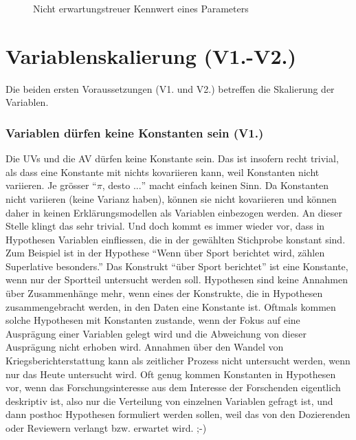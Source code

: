 \documentclass[
  10pt,
  letterpaper,
  a4paper, twoside]{scrreprt}
\begin{document}
\begin{tcolorbox}
\begin{figure}[H]


\caption{\label{fig-Kennwert-Parameter}Nicht erwartungstreuer Kennwert
eines Parameters}

\end{figure}%

\end{tcolorbox}

\section{Variablenskalierung
(V1.-V2.)}\label{variablenskalierung-v1.-v2.}

Die beiden ersten Voraussetzungen (V1. und V2.) betreffen die Skalierung
der Variablen.

\subsubsection{Variablen dürfen keine Konstanten sein
(V1.)}\label{sec:V1}

Die UVs und die AV dürfen keine Konstante sein. Das ist insofern recht
trivial, als dass eine Konstante mit nichts kovariieren kann, weil
Konstanten nicht variieren. Je grösser \enquote{\(\pi\), desto \(...\)}
macht einfach keinen Sinn. Da Konstanten nicht variieren (keine Varianz
haben), können sie nicht kovariieren und können daher in keinen
Erklärungsmodellen als Variablen einbezogen werden. An dieser Stelle
klingt das sehr trivial. Und doch kommt es immer wieder vor, dass in
Hypothesen Variablen einfliessen, die in der gewählten Stichprobe
konstant sind. Zum Beispiel ist in der Hypothese \enquote{Wenn über
Sport berichtet wird, zählen Superlative besonders.} Das Konstrukt
\enquote{über Sport berichtet} ist eine Konstante, wenn nur der
Sportteil untersucht werden soll. Hypothesen sind keine Annahmen über
Zusammenhänge mehr, wenn eines der Konstrukte, die in Hypothesen
zusammengebracht werden, in den Daten eine Konstante ist. Oftmals kommen
solche Hypothesen mit Konstanten zustande, wenn der Fokus auf eine
Ausprägung einer Variablen gelegt wird und die Abweichung von dieser
Ausprägung nicht erhoben wird. Annahmen über den Wandel von
Kriegsberichterstattung kann als zeitlicher Prozess nicht untersucht
werden, wenn nur das Heute untersucht wird. Oft genug kommen Konstanten
in Hypothesen vor, wenn das Forschungsinteresse aus dem Interesse der
Forschenden eigentlich deskriptiv ist, also nur die Verteilung von
einzelnen Variablen gefragt ist, und dann posthoc Hypothesen formuliert
werden sollen, weil das von den Dozierenden oder Reviewern verlangt bzw.
erwartet wird. ;-)
\end{document}

